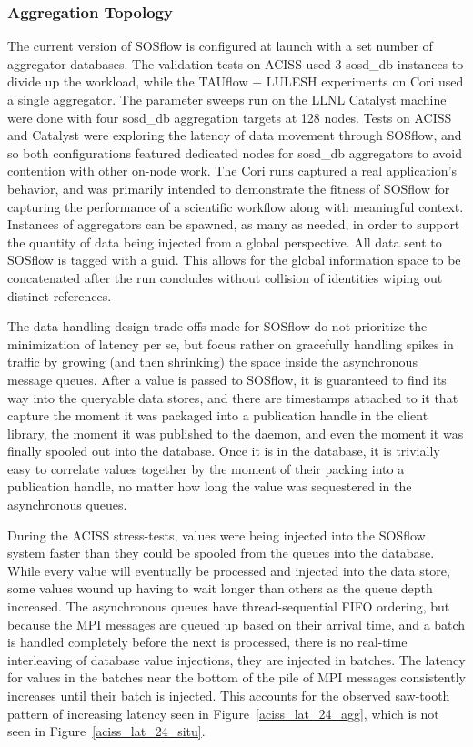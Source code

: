 \subsubsection{Aggregation Topology}
The current version of SOSflow is configured at launch with a set
number of aggregator databases.
%
The validation tests on ACISS used 3 sosd\_db instances to divide up
the workload, while the TAUflow + LULESH experiments on Cori used a
single aggregator.
%
The parameter sweeps run on the LLNL Catalyst machine were done with
four sosd\_db aggregation targets at 128 nodes.
%
Tests on ACISS and Catalyst were exploring the latency of data
movement through SOSflow, and so both configurations featured
dedicated nodes for sosd\_db aggregators to avoid contention
with other on-node work.
%
The Cori runs captured a real application's behavior, and was primarily
intended to demonstrate the fitness of SOSflow for capturing the
performance of a scientific workflow along with meaningful context.
%
Instances of aggregators can be spawned, as many as needed, in order
to support the quantity of data being injected from a global
perspective.
%
All data sent to SOSflow is tagged with a guid.
%
This allows for the global information space to be concatenated
after the run concludes without collision of identities wiping out
distinct references.
%
\par
%
The data handling design trade-offs made for SOSflow do not prioritize
the minimization of latency per se, but focus rather on gracefully
handling spikes in traffic by growing (and then shrinking) the space
inside the asynchronous message queues.
%
After a value is passed to SOSflow, it is guaranteed to find its
way into the queryable data stores, and there are timestamps attached
to it that capture the moment it was packaged into a publication handle in
the client library, the moment it was published to the daemon, and
even the moment it was finally spooled out into the database.
%
Once it is in the database, it is trivially easy to correlate values
together by the moment of their packing into a publication handle, no matter
how long the value was sequestered in the asynchronous queues.
%
\par
%
During the ACISS stress-tests, values were being injected into the
SOSflow system faster than they could be spooled from the queues into
the database.
%
While every value will eventually be processed and injected into the data
store, some values wound up having to wait longer than others as the queue
depth increased.
%
The asynchronous queues have thread-sequential FIFO ordering, but
because the MPI messages are queued up based on their arrival time,
and a batch is handled completely before the next is processed, there
is no real-time interleaving of database value injections, they are
injected in batches.
%
The latency for values in the batches near the bottom of the pile of
MPI messages consistently increases until their batch is injected.
%
This accounts for the observed saw-tooth pattern of increasing latency
seen in Figure~\ref{aciss_lat_24_agg}, which is not seen in
Figure~\ref{aciss_lat_24_situ}.
%
%


